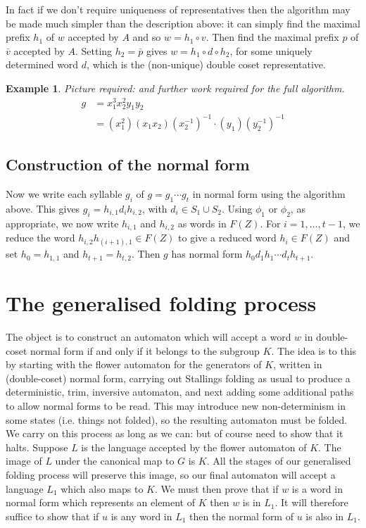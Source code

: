 \documentclass[a4paper,12pt]{article}
\newtheorem{exam}[theorem]{Example}
\newenvironment{example}{\begin{exam} \rm}{\end{exam}}
\numberwithin{equation}{section}
\numberwithin{figure}{section}
\begin{document}
In fact if we don't require uniqueness of representatives then the algorithm 
may be made much simpler than the description above: it can 
simply find the maximal prefix $h_1$ of $w$  accepted  by $A$  and so $w=h_1\circ v$. Then find the
maximal prefix $p$ of $\bar v$ accepted by $A$. Setting $h_2=\bar p$ gives $w=h_1\circ d \circ h_2$, for
some uniquely determined word $d$, which is the (non-unique) 
double coset representative. 


\begin{example}
Picture required: and further work required for the full algorithm.
\begin{align*} 
g &= x_1^3x_2^2y_1y_2 \\ 
&= (x_1^2)(x_1x_2)(x_2^{-1})^{-1} \cdot (y_1)(y_2^{-1})^{-1}
\end{align*}
\end{example}

\subsection{Construction of the normal form}

Now we write each syllable $g_i$ of $g=g_1\cdots g_t$ in normal form using the algorithm above. 
This gives $g_i=h_{i,1}d_ih_{i,2}$, with $d_i\in S_1\cup S_2$. Using $\phi_1$ or $\phi_2$, as appropriate,
we now write $h_{i,1}$ and $h_{i,2}$ as words in $F(Z)$. For $i=1,\ldots , t-1$, we reduce the 
word $h_{i,2}h_{(i+1),1}\in F(Z)$ to give a reduced word $h_i\in F(Z)$ and set $h_0=h_{1,1}$ and  $h_{t+1}=h_{t,2}$.
Then $g$ has normal form $h_0d_1h_1\cdots d_th_{t+1}$.
%
%
\section{The generalised folding process}
The object is to construct an automaton which will accept a word $w$
in double-coset normal form if and only if it belongs to the subgroup $K$.
The idea is to this by starting with the flower automaton for the 
generators of $K$, written in (double-coset) normal form, carrying out
Stallings folding as usual to produce a deterministic, trim, inversive 
automaton, and next adding some additional paths to allow normal forms
to be read. This may introduce new non-determinism in some  states (i.e.
things not folded), so
the resulting automaton must be folded. We carry on this process as long
as we can: but of course need to show that it halts. Suppose $L$ is the 
language accepted by the flower automaton of $K$. The image of $L$ under
the canonical map to $G$ is $K$. All the stages of our generalised folding
process will preserve this image, so our final automaton will accept a language
$L_1$ which also maps to $K$. We must then prove that if $w$ is a word
in normal form which represents an element of $K$ then $w$ is in $L_1$. It will
therefore suffice to show that if $u$ is any word in $L_1$ then the 
normal form of $u$ is also in $L_1$. 
\end{document}
